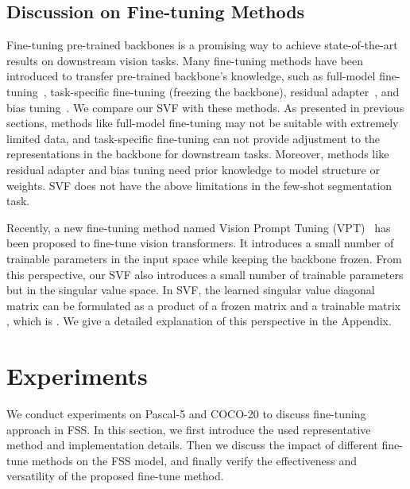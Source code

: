 \documentclass{article}
\begin{document}
\subsection{Discussion on Fine-tuning Methods} \label{sec3.3}
\vspace{-.2em}
Fine-tuning pre-trained backbones is a promising way to achieve state-of-the-art results on downstream vision tasks. Many fine-tuning methods have been introduced to transfer pre-trained backbone's knowledge, such as full-model fine-tuning~\cite{he2017mask, zhang2020feature}, task-specific fine-tuning (freezing the backbone)\cite{he2020momentum,xie2021few}, residual adapter~\cite{houlsby2019parameter,bapna2019simple,wang2021k}, and bias tuning~\cite{zhang2020revisiting, guo2019spottune}. We compare our SVF with these methods. As presented in previous sections, methods like full-model fine-tuning may not be suitable with extremely limited data, and task-specific fine-tuning can not provide adjustment to the representations in the backbone for downstream tasks. Moreover, methods like residual adapter and bias tuning need prior knowledge to model structure or weights. SVF does not have the above limitations in the few-shot segmentation task.

Recently, a new fine-tuning method named Vision Prompt Tuning (VPT)~\cite{jia2022visual} has been proposed to fine-tune vision transformers. It introduces a small number of trainable parameters in the input space while keeping the backbone frozen. From this perspective, our SVF also introduces a small number of trainable parameters but in the singular value space. In SVF, the learned singular value diagonal matrix  can be formulated as a product of a frozen matrix  and a trainable matrix , which is . We give a detailed explanation of this perspective in the Appendix.
\vspace{-.8em}



 
\section{Experiments}
\vspace{-0.9em}
We conduct experiments on Pascal-5 \cite{shaban2017one} and COCO-20 \cite{nguyen2019feature} to discuss fine-tuning approach in FSS. In this section, we first introduce the used representative method and implementation details. Then we discuss the impact of different fine-tune methods on the FSS model, and finally verify the effectiveness and versatility of the proposed fine-tune method.
\end{document}
